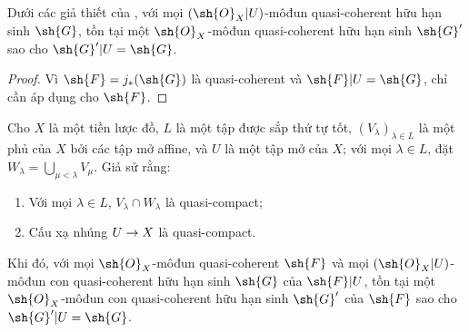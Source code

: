 \documentclass[oneside]{amsart}
\makeatletter
\newcommand{\ega@arrow}[2]{\mathchoice{#1}{#2}{#2}{#2}}
\renewcommand{\to}{\ega@arrow{\longrightarrow}{\rightarrow}}
\let\EGAOriginalLabel\label
\renewcommand{\label}[1]{\phantomsection\EGAOriginalLabel{#1}}
\makeatother
\begin{document}
\begin{corollary}[9.4.5]
\label{I.9.4.5}
Dưới các giả thiết của , với mọi $(\sh{O}_X|U)$-môđun quasi-coherent
hữu hạn sinh $\sh{G}$, tồn tại một $\sh{O}_X$-môđun quasi-coherent hữu hạn sinh
$\sh{G}'$ sao cho $\sh{G}'|U=\sh{G}$.
\end{corollary}

\begin{proof}
Vì $\sh{F}=j_*(\sh{G})$ là quasi-coherent  và
$\sh{F}|U=\sh{G}$, chỉ cần áp dụng  cho $\sh{F}$.
\end{proof}

\begin{lemma}[9.4.6]
\label{I.9.4.6}
Cho $X$ là một tiền lược đồ, $L$ là một tập được sắp thứ tự tốt,
$(V_\lambda)_{\lambda\in L}$ là một phủ của $X$ bởi các tập mở affine, và $U$ là một
tập mở của $X$; với mọi $\lambda\in L$, đặt
$W_\lambda=\bigcup_{\mu<\lambda}V_\mu$. Giả sử rằng:
\begin{enumerate}
  \item[1\textsuperscript{o}] Với mọi $\lambda\in L$,
    $V_\lambda\cap W_\lambda$ là quasi-compact;
  \item[2\textsuperscript{o}] Cấu xạ nhúng $U\to X$ là quasi-compact.
\end{enumerate}
Khi đó, với mọi $\sh{O}_X$-môđun quasi-coherent $\sh{F}$ và mọi
$(\sh{O}_X|U)$-môđun con quasi-coherent hữu hạn sinh $\sh{G}$ của $\sh{F}|U$, tồn tại
một $\sh{O}_X$-môđun con quasi-coherent hữu hạn sinh $\sh{G}'$ của $\sh{F}$ sao cho
$\sh{G}'|U=\sh{G}$.
\end{lemma}
\end{document}
